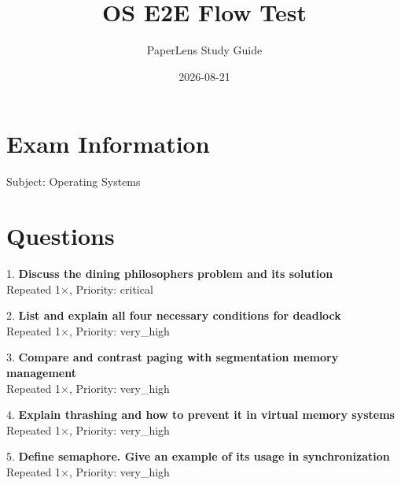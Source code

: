 \documentclass[11pt,a4paper]{article}
\title{OS E2E Flow Test}
\author{PaperLens Study Guide}
\date{2026-08-21}
\begin{document}
\maketitle
\section*{Exam Information}
Subject: Operating Systems

\section{Questions}
1. \textbf{Discuss the dining philosophers problem and its solution}\\
Repeated 1$\times$, Priority: critical

2. \textbf{List and explain all four necessary conditions for deadlock}\\
Repeated 1$\times$, Priority: very_high

3. \textbf{Compare and contrast paging with segmentation memory management}\\
Repeated 1$\times$, Priority: very_high

4. \textbf{Explain thrashing and how to prevent it in virtual memory systems}\\
Repeated 1$\times$, Priority: very_high

5. \textbf{Define semaphore. Give an example of its usage in synchronization}\\
Repeated 1$\times$, Priority: very_high
\end{document}
